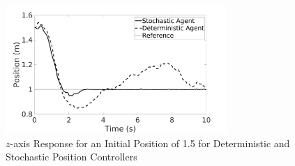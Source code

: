     \begin{figure}[H]
            \centering
            \includegraphics[width=0.75\textwidth]{plots/z2.jpg}
            \caption{$z$-axis Response for an Initial Position of 1.5 for Deterministic and Stochastic Position Controllers}
            \label{z2}
    \end{figure}\clearpage
